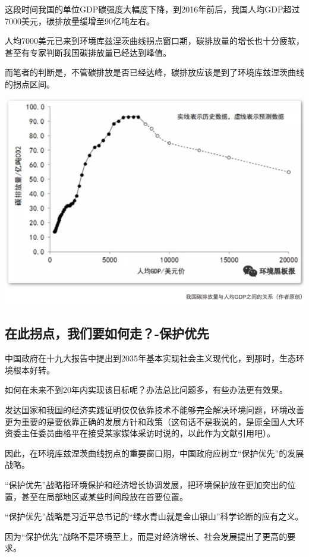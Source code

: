 \documentclass[]{book}
\begin{document}
这段时间我国的单位GDP碳强度大幅度下降，到2016年前后，我国人均GDP超过7000美元，碳排放量缓增至90亿吨左右。

人均7000美元已来到环境库兹涅茨曲线拐点窗口期，碳排放量的增长也十分疲软，甚至有专家判断我国碳排放量已经达到峰值。

而笔者的判断是，不管碳排放是否已经达峰，碳排放应该是到了环境库兹涅茨曲线的拐点区间。

\includegraphics[width=8.33in]{images/huanjing2}

\subsection{在此拐点，我们要如何走？-保护优先}\label{-}

中国政府在十九大报告中提出到2035年基本实现社会主义现代化，到那时，生态环境根本好转。

如何在未来不到20年内实现该目标呢？办法总比问题多，有些办法更有效果。

发达国家和我国的经济实践证明仅仅依靠技术不能够完全解决环境问题，环境改善更为重要的是要依靠正确的发展方针和政策（这句话不是我说的，是原全国人大环资委主任委员曲格平在接受某家媒体采访时说的，以此作为文献引用吧）。

因此，在环境库兹涅茨曲线拐点的重要窗口期，中国政府应树立``保护优先''的发展战略。

``保护优先''战略指环境保护和经济增长协调发展，把环境保护放在更加突出的位置，甚至在局部地区或某些时间段放在首要位置。

``保护优先''战略是习近平总书记的``绿水青山就是金山银山''科学论断的应有之义。

因为``保护优先''战略不是环境至上，而是对经济增长、社会发展提出了更高的要求。
\end{document}
